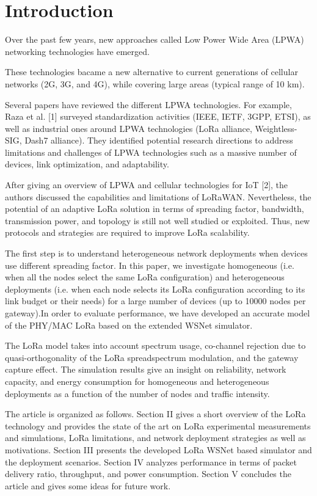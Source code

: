 \section{Introduction} \label{sec:Introduction}

Over the past few years,
	new approaches called Low Power Wide Area (LPWA) networking technologies have emerged.

These technologies bacame a new alternative to current generations of cellular networks (2G, 3G, and 4G),
	while covering large areas (typical range of 10 km).

Several papers have reviewed the different LPWA technologies.
For example,
	Raza et al. [1] surveyed standardization activities (IEEE, IETF, 3GPP, ETSI),
	as well as industrial ones around LPWA technologies (LoRa alliance, Weightless-SIG, Dash7 alliance).
They identified potential research directions to address limitations and challenges of LPWA technologies such as a massive number of devices,
	link optimization, and adaptability.


After giving an overview of LPWA and cellular technologies for IoT [2],
	the authors discussed the capabilities and limitations of LoRaWAN.
Nevertheless,
	the potential of an adaptive LoRa solution in terms of spreading factor,
	bandwidth,
	transmission power,
	and topology is still not well studied or exploited.
Thus,
	new protocols and strategies are required to improve LoRa scalability.

The first step is to understand heterogeneous network deployments when devices use different spreading factor.
In this paper,
	we investigate homogeneous (i.e.
when all the nodes select the same LoRa configuration) and heterogeneous deployments (i.e.
when each node selects its LoRa configuration according to its link budget or their needs) for a large number of devices (up to 10000 nodes per gateway).In order to evaluate performance,
	we have developed an accurate model of the PHY/MAC LoRa based on the extended WSNet simulator.

The LoRa model takes into account spectrum usage,
	co-channel rejection due to quasi-orthogonality of the LoRa spreadspectrum modulation,
	and the gateway capture effect.
The simulation results give an insight on reliability,
	network capacity,
	and energy consumption for homogeneous and heterogeneous deployments as a function of the number of nodes and traffic intensity.

The article is organized as follows.
Section II gives a short overview of the LoRa technology and provides the state of the art on LoRa experimental measurements and simulations,
	LoRa limitations,
	and network deployment strategies as well as motivations.
Section III presents the developed LoRa WSNet based simulator and the deployment scenarios.
Section IV analyzes performance in terms of packet delivery ratio,
	throughput,
	and power consumption.
Section V concludes the article and gives some ideas for future work.




